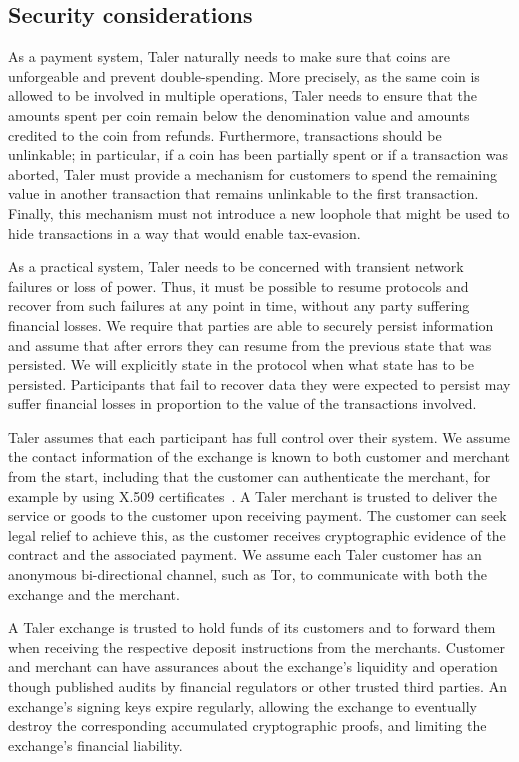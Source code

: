 \documentclass[sigconf, authordraft]{acmart}
\begin{document}
\subsection{Security considerations}

As a payment system, Taler naturally needs to make sure that coins are
unforgeable and prevent double-spending.  More precisely, as the same
coin is allowed to be involved in multiple operations, Taler needs to
ensure that the amounts spent per coin remain below the denomination
value and amounts credited to the coin from refunds.  Furthermore,
transactions should be unlinkable; in particular, if a coin has been
partially spent or if a transaction was aborted, Taler must provide a
mechanism for customers to spend the remaining value in another
transaction that remains unlinkable to the first transaction.  Finally,
this mechanism must not introduce a new loophole that might be used to
hide transactions in a way that would enable tax-evasion.

As a practical system, Taler needs to be concerned with transient
network failures or loss of power.  Thus, it must be possible to
resume protocols and recover from such failures at any point in time,
without any party suffering financial losses.  We require that parties
are able to securely persist information and assume that after
errors they can resume from the previous state that was persisted.
We will explicitly state in the protocol when what state has
to be persisted.  Participants that fail to recover data they were
expected to persist may suffer financial losses in proportion to the
value of the transactions involved.

Taler assumes that each participant has full control over their
system.  We assume the contact information of the exchange is known to
both customer and merchant from the start, including that the customer
can authenticate the merchant, for example by using X.509
certificates~\cite{rfc6818}.  A Taler merchant is trusted to deliver
the service or goods to the customer upon receiving payment.  The
customer can seek legal relief to achieve this, as the customer
receives cryptographic evidence of the contract and the associated
payment.  We assume each Taler customer has an anonymous
bi-directional channel, such as Tor, to communicate with both the
exchange and the merchant.

A Taler exchange is trusted to hold funds of its customers and to
forward them when receiving the respective deposit instructions from
the merchants.  Customer and merchant can have assurances about the
exchange's liquidity and operation though published audits by
financial regulators or other trusted third parties.  An exchange's
signing keys expire regularly, allowing the exchange to eventually
destroy the corresponding accumulated cryptographic proofs, and
limiting the exchange's financial liability.
\end{document}

